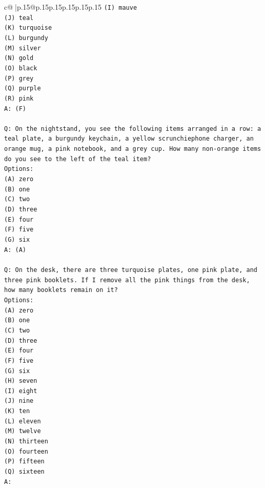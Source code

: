 \documentclass{article}
\begin{document}
{\begin{supertabular}{c@{$\;$}|p{.15\linewidth}@{}p{.15\linewidth}p{.15\linewidth}p{.15\linewidth}p{.15\linewidth}p{.15\linewidth}}
{{{\texttt{(I) mauve} \\
\texttt{(J) teal} \\
\texttt{(K) turquoise} \\
\texttt{(L) burgundy} \\
\texttt{(M) silver} \\
\texttt{(N) gold} \\
\texttt{(O) black} \\
\texttt{(P) grey} \\
\texttt{(Q) purple} \\
\texttt{(R) pink} \\
\texttt{A: (F)} \\
\\ 
\texttt{Q: On the nightstand, you see the following items arranged in a row: a teal plate, a burgundy keychain, a yellow scrunchiephone charger, an orange mug, a pink notebook, and a grey cup. How many non{-}orange items do you see to the left of the teal item?} \\
\texttt{Options:} \\
\texttt{(A) zero} \\
\texttt{(B) one} \\
\texttt{(C) two} \\
\texttt{(D) three} \\
\texttt{(E) four} \\
\texttt{(F) five} \\
\texttt{(G) six} \\
\texttt{A: (A)} \\
\\ 
\texttt{Q: On the desk, there are three turquoise plates, one pink plate, and three pink booklets. If I remove all the pink things from the desk, how many booklets remain on it?} \\
\texttt{Options:} \\
\texttt{(A) zero} \\
\texttt{(B) one} \\
\texttt{(C) two} \\
\texttt{(D) three} \\
\texttt{(E) four} \\
\texttt{(F) five} \\
\texttt{(G) six} \\
\texttt{(H) seven} \\
\texttt{(I) eight} \\
\texttt{(J) nine} \\
\texttt{(K) ten} \\
\texttt{(L) eleven} \\
\texttt{(M) twelve} \\
\texttt{(N) thirteen} \\
\texttt{(O) fourteen} \\
\texttt{(P) fifteen} \\
\texttt{(Q) sixteen} \\
\texttt{A:} \\
            }
        }
    }
     \\ \\


\end{supertabular}}
\end{document}
